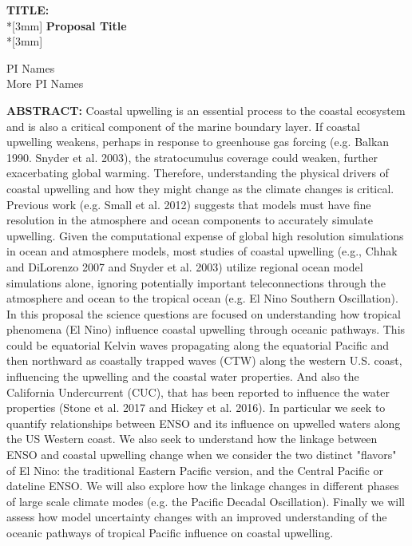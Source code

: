 \begin{center}
{\Large{\bf TITLE:}}\\*[3mm]
{\bf Proposal Title} \\*[3mm]

PI Names \\
More PI Names

\end{center}


\textbf{ABSTRACT:}
Coastal upwelling is an essential process to the coastal ecosystem and is also a critical component of the marine boundary layer.  If coastal upwelling weakens, perhaps in response to greenhouse gas forcing (e.g. Balkan 1990. Snyder et al. 2003), the stratocumulus coverage could weaken, further exacerbating global warming.  Therefore, understanding the physical drivers of coastal upwelling and how they might change as the climate changes is critical.  Previous work (e.g. Small et al. 2012) suggests that models must have fine resolution in the atmosphere and ocean components to accurately simulate upwelling.  Given the computational expense of global high resolution simulations in ocean and atmosphere models, most studies of coastal upwelling (e.g., Chhak and DiLorenzo 2007 and Snyder et al. 2003) utilize regional ocean model simulations alone, ignoring potentially important teleconnections through the atmosphere and ocean to the tropical ocean (e.g. El Nino Southern Oscillation).  In this proposal the science questions are focused on understanding how tropical phenomena (El Nino) influence coastal upwelling through oceanic pathways.  This could be equatorial Kelvin waves propagating along the equatorial Pacific and then northward as coastally trapped waves (CTW) along the western U.S. coast, influencing the upwelling and the coastal water properties. And also the California Undercurrent (CUC), that has been reported to influence the water properties (Stone et al. 2017 and Hickey et al. 2016).  In particular we seek to quantify relationships between ENSO and its influence on upwelled waters along the US Western coast.   We also seek to understand how the linkage between ENSO and coastal upwelling change when we consider the two distinct "flavors" of El Nino: the traditional Eastern Pacific version, and the Central Pacific or dateline ENSO.  We will also explore how the linkage changes in different phases of large scale climate modes (e.g. the Pacific Decadal Oscillation).  Finally we will assess how model uncertainty changes with an improved understanding of the oceanic pathways of tropical Pacific influence on coastal upwelling.

